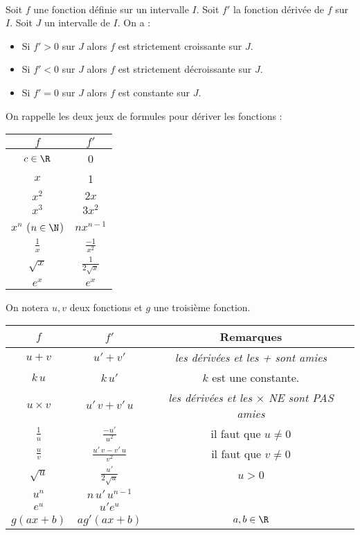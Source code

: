\documentclass[12pt,fleqn]{report} %
\begin{document}
\begin{theorem}\text{ }\\
	Soit $f$ une fonction définie sur un intervalle $I$. Soit $f'$ la fonction dérivée de $f$ sur $I$. Soit $J$ un intervalle de $I$. On a : 
	\begin{itemize}
		\item Si $f' > 0$ sur $J$ alors $f$ est strictement croissante sur $J$.
		\item Si $f' < 0$ sur $J$ alors $f$ est strictement décroissante sur $J$.
		\item Si $f' = 0$ sur $J$ alors $f$ est constante sur $J$.
	\end{itemize}
\end{theorem}
On rappelle les deux jeux de formules pour dériver les fonctions : 
\begin{center}
	\begin{tabular}{|c|c|}
		\hline
		$f$ & $f'$ \\ \hline
		$c \in \R$ & 0 \\ \hline
		$x$ & 1 \\ \hline
		$x^2$ & $2x$ \\ \hline
		$x^3$ & $3 x^2$ \\ \hline
		$x^n$ ($n\in \N$) & $n x^{n-1}$ \\ \hline
		$\frac{1}{x}$ & $\frac{-1}{x^2}$ \\ \hline
		$\sqrt{x}$ & $\frac{1}{2 \sqrt{x}}$ \\ \hline
		$e^x$ & $e^x$ \\ \hline
	\end{tabular}
\end{center}
On notera $u,v$ deux fonctions et $g$ une troisième fonction.
\begin{center}
	\begin{tabular}{|c|c|c|}
		\hline
		$f$ & $f'$ & Remarques \\ \hline
		$u + v$ & $u' + v'$ & \textit{les dérivées et les + sont amies} \\ \hline
		$ k \, u $ & $k \, u'$ & $k$ est une constante. \\ \hline
		$ u \times v $  & $u'\,v + v'\,u$ & \textit{les dérivées et les $\times$ NE sont PAS amies} \\ \hline
		$\frac{1}{u}$ & $\frac{-u'}{u^2}$ & il faut que $u \neq 0$ \\ \hline
		$\frac{u}{v}$ & $\frac{u'\, v - v'\,u}{v^2}$ & il faut que $v\neq 0$ \\ \hline
		$\sqrt{u}$ & $\frac{u'}{2 \sqrt{u}}$ &  $u >0$ \\ \hline
		$u^n$ & $n \, u' \, u^{n-1}$ &  \\ \hline
		$e^u$ & $u' e^u$ & \\ \hline
		$g(ax + b)$ & $a g'(ax+b)$ & $a,b \in \R$ \\ \hline
	\end{tabular}
\end{center}
\end{document}
